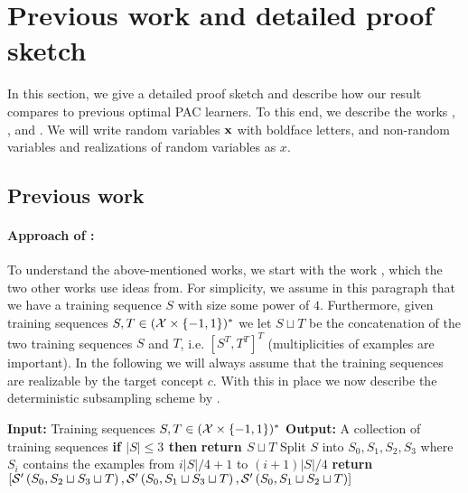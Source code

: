 \section{Previous work and detailed proof sketch}\label{sec:proofoverview}

In this section, we give a detailed proof sketch and describe how our result compares to previous optimal PAC learners. To this end, we describe the works \cite{hannekeoptimal}, \cite{Optimalweaktostronglearning}, and \cite{baggingoptimalPAClearner}. We will write random variables  $ \mathbf{x} $ with boldface letters, and non-random variables and realizations of random variables as $ x $. 
\subsection{Previous work} 
\paragraph{Approach of \cite{hannekeoptimal}:}
To understand the above-mentioned works, we start with the work \cite{hannekeoptimal}, which the two other works use ideas from. For simplicity, we assume in this paragraph that we have a training sequence $ S $ with size some power of $4$. Furthermore, given training sequences $S,T\in (\mathcal{X} \times \{-1,1\})^{*}$ we let $ S\sqcup T $ be the concatenation of the two training sequences $ S $ and $ T $, i.e.   $ [S^{T},T^{T}]^{T} $ (multiplicities of examples are important). In the following we will always assume that the training sequences are realizable by the target concept $ c.$  With this in place we now describe the deterministic subsampling scheme by \cite{hannekeoptimal}. 
\begin{algorithm}[H]
  \caption{$\cS'(S,T)$}\label{alg:Subsamplehanneke}
  \begin{algorithmic}[1]
    \State \textbf{Input:} Training sequences $S ,T\in (\mathcal{X}\times \{-1,1\})^{*}$ 
    \State \textbf{Output:}{ A collection of training sequences}
      \State \textbf{if $ |S|\leq 3 $ then}
      \State\hspace{0.5cm}\textbf{return $ S\sqcup T $ }
      \State Split $ S $ into  $S_0,S_{1},S_{2},S_{3}$  where $ S_i $ contains the examples from $i|S|/4+1$ to $ (i+1)|S|/4$
      \State \textbf{return}$[\mathcal{S}'\left(S_0 , S_2 \sqcup S_3 \sqcup T\right) , \mathcal{S}'\left(S_0 , S_1 \sqcup S_3 \sqcup T\right) , \mathcal{S}'\left(S_0 , S_1 \sqcup S_2 \sqcup T\right)]$
  \end{algorithmic} 
\end{algorithm}
